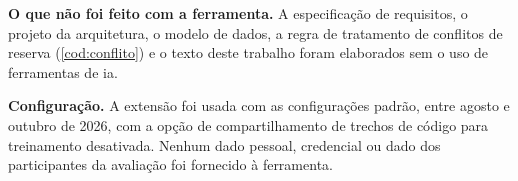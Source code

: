\textbf{O que não foi feito com a ferramenta.} A especificação de requisitos,
o projeto da arquitetura, o modelo de dados, a regra de tratamento de
conflitos de reserva (\cref{cod:conflito}) e o texto deste trabalho foram
elaborados sem o uso de ferramentas de \acs{ia}.

\textbf{Configuração.} A extensão foi usada com as configurações padrão,
entre agosto e outubro de 2026, com a opção de compartilhamento de trechos de
código para treinamento desativada. Nenhum dado pessoal, credencial ou dado
dos participantes da avaliação foi fornecido à ferramenta.
